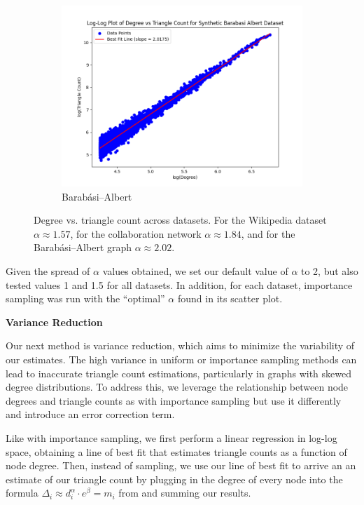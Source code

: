 \documentclass[11pt, margin=1in]{article}
\begin{document}
\begin{figure}[H]
    \hfill
    \begin{subfigure}[b]{0.495\textwidth}
        \centering
        \includegraphics[width=\textwidth]{plots/degree-vs-triangle-count/degree_vs_triangle_count_ba.png}
        \caption{Barabási–Albert}
        \label{fig:degree_vs_tri_ba}
    \end{subfigure}

    \caption{Degree vs. triangle count across datasets. For the Wikipedia dataset $\alpha \approx 1.57$, for the collaboration network $\alpha \approx 1.84$, and for the Barabási–Albert graph $\alpha \approx 2.02$.}
    \label{fig:degree_vs_tri_others}
\end{figure}

Given the spread of $\alpha$ values obtained, we set our default value of $\alpha$ to 2, but also tested values 1 and 1.5 for all datasets.
In addition, for each dataset, importance sampling was run with the ``optimal'' $\alpha$ found in its scatter plot.

\textbf{Variance Reduction}
\label{variance-reduction-algo}

Our next method is variance reduction, which aims to minimize the variability of our estimates.
The high variance in uniform or importance sampling methods can lead to inaccurate triangle count estimations, particularly in graphs with skewed degree distributions.
To address this, we leverage the relationship between node degrees and triangle counts as with importance sampling but use it differently and introduce an error correction term.

Like with importance sampling, we first perform a linear regression in log-log space, obtaining a line of best fit that estimates triangle counts as a function of node degree.
Then, instead of sampling, we use our line of best fit to arrive an an estimate of our triangle count by plugging in the degree of every node into the formula $\Delta_i \approx d_i^\alpha \cdot e^\beta = m_i$ from  and summing our results.
\end{document}
